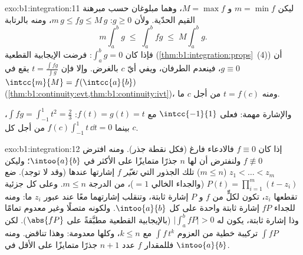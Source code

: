\begin{solution}{exo:b1:integration:11}
ليكن $m = \min f$ و $M = \max f$، وهما مبلوغان حسب مبرهنة القيم
الحدّية. ولأن $g \geq 0$: $m\,g \leq fg \leq M\,g$، ومنه بالرتابة
\[
m \int_a^b g \;\leq\; \int_a^b fg \;\leq\; M \int_a^b g .
\]
فإذا كان $\int_a^b g = 0$: فرضت الإيجابية القطعية
(\cref{thm:b1:integration:props}~(4)) أن $g \equiv 0$، فينعدم
الطرفان، ويفي أيّ $c$ بالغرض. وإلا فإن $t = \frac{\int
fg}{\int g}$ يقع في $\intcc{m}{M} = f(\intcc{a}{b})$
(\cref{thm:b1:continuity:evt,thm:b1:continuity:ivt})، ومنه $t =
f(c)$ من أجل $c$ ما.

والإشارة مهمة: فعلى $\intcc{-1}{1}$ مع $f(t) = g(t) = t$: $\int
fg = \int_{-1}^1 t^2 = \frac23$، بينما $f(c)\int_{-1}^1 t\,\dd t
= 0$ من أجل كل $c$.
\end{solution}

\begin{solution}{exo:b1:integration:12}
إذا كان $f \equiv 0$ فالادعاء فارغ (فكل نقطة جذر). ومنه
افترض $f \not\equiv 0$ ولنفترض أن لها $n$ جذرًا متمايزًا على الأكثر
في $\intoo{a}{b}$؛ وليكن $z_1 < \dots < z_m$ ($m \leq n$)
تلك الجذور التي \emph{تغيّر} $f$ إشارتها عندها (وقد لا توجد). ضع
$P(t) = \prod_{i=1}^{m}(t - z_i)$ (والجداء الخالي $= 1$)، من
الدرجة $m \leq n$. وعلى كل  جزئية تقطعها $z_i$، تكون لكلٍّ من
$f$ و $P$ إشارة ثابتة، وتنقلب إشارتهما معًا عند عبور
$z_i$ ما: ومنه للجداء $fP$ إشارة ثابتة واحدة على كل
$\intoo{a}{b}$. ولكونه متصلًا وغير معدوم تمامًا وذا
إشارة ثابتة، يكون له $\bigl|\int_a^b fP\bigr| > 0$ (بالإيجابية
القطعية مطبَّقةً على $\abs{fP}$). لكن $\int f P$ تركيبة
خطية من العزوم $\int f\,t^k$ مع $k \leq n$، وكلها معدومة:
وهذا تناقض. ومنه فللمقدار $f$ عدد $n + 1$ جذرًا متمايزًا على الأقل في
$\intoo{a}{b}$.
\end{solution}

